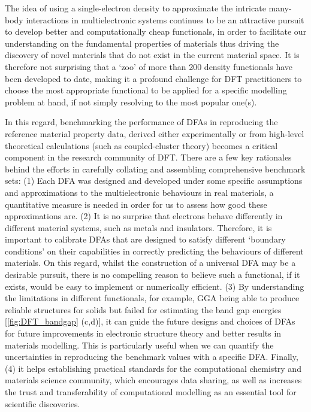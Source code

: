 

The idea of using a single-electron density to approximate the intricate many-body interactions in multielectronic systems continues to be an attractive pursuit to develop better and computationally cheap functionals, in order to facilitate our understanding on the fundamental properties of materials thus driving the discovery of novel materials that do not exist in the current material space. It is therefore not surprising that a `zoo'\cite{goerigk2019trip} of more than 200 density functionals\cite{mardirossian2017thirty} have been developed to date, making it a profound challenge for DFT practitioners to choose the most appropriate functional to be applied for a specific modelling problem at hand, if not simply resolving to the most popular one(s).\cite{kruse2012standard}

In this regard, benchmarking the performance of DFAs in reproducing the reference material property data, derived either experimentally or from high-level theoretical calculations (such as coupled-cluster theory\cite{bartlett2007coupled}) becomes a critical component in the research community of DFT. There are a few key rationales behind the efforts in carefully collating and assembling comprehensive benchmark sets: (1) Each DFA was designed and developed under some specific assumptions and approximations to the multielectronic behaviours in real materials, a quantitative measure is needed in order for us to assess how good these approximations are. (2) It is no surprise that electrons behave differently in different material systems, such as metals and insulators. Therefore, it is important to calibrate DFAs that are designed to satisfy different `boundary conditions' on their capabilities in correctly predicting the behaviours of different materials.  On this regard, whilst the construction of a universal DFA may be a desirable pursuit, there is no compelling reason to believe such a functional, if it exists, would be easy to implement or numerically efficient.\cite{DFT_exchange} (3) By understanding the limitations in different functionals, for example, GGA being able to produce reliable structures for solids but failed for estimating the band gap energies [\cref{fig:DFT_bandgap} (c,d)], it can guide the future designs and choices of DFAs for future improvements in electronic structure theory and better results in materials modelling. This is particularly useful when we can quantify the uncertainties in reproducing the benchmark values with a specific DFA. Finally, (4) it helps establishing practical standards for the computational chemistry and materials science community, which encourages data sharing, as well as increases the trust and transferability of computational modelling as an essential tool for scientific discoveries.\cite{DFT_exchange}



